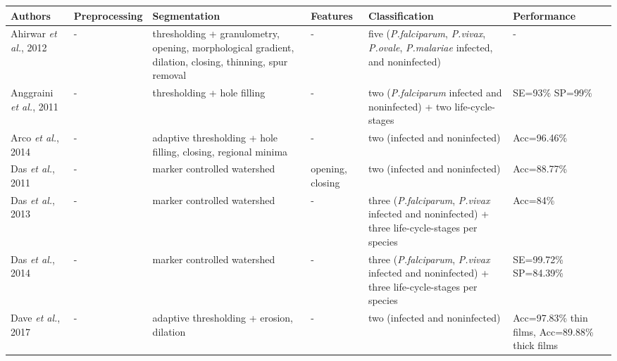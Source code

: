 \footnotesize
\begin{longtable}{C{1.4cm} C{1.5cm} C{2.1cm} C{1.5cm} C{2.7cm} C{2.2cm} }
	\hline
   	\textbf{Authors} & \textbf{Preprocessing} & \textbf{Segmentation} & \textbf{Features} & \textbf{Classification} & \textbf{Performance}  \\[1pt] \hline

Ahirwar \emph{et al.}, 2012  &
   	- &
   	thresholding + granulometry, opening, morphological gradient, dilation, closing, thinning, spur removal &
   	- &
   	five (\emph{P.falciparum}, \emph{P.vivax}, \emph{P.ovale}, \emph{P.malariae} infected, and noninfected) &
   	- \vspace{0.6cm} \\

Anggraini \emph{et al.}, 2011 &
	- &
	thresholding + hole filling &	
	- &
	two (\emph{P.falciparum} infected and noninfected) + two life-cycle-stages &
	SE=93\% SP=99\%
    \vspace{0.6cm}
	\\
Arco \emph{et al.}, 2014 &
	- &
	adaptive thresholding + hole filling, closing, regional minima &	
	- &
	two (infected and noninfected) &
	Acc=96.46\%
	\vspace{0.6cm}
    \\
Das \emph{et al.}, 2011 &
	- &
	marker controlled watershed &	
	opening, closing  &
	two (infected and noninfected) &
	Acc=88.77\%
	\vspace{0.6cm}
    \\

Das \emph{et al.}, 2013 &
	- &
	marker controlled watershed &	
	- &
three (\emph{P.falciparum}, \emph{P.vivax} infected and noninfected) + three life-cycle-stages per species &
	Acc=84\%
	\vspace{0.6cm}
    \\

Das \emph{et al.}, 2014 &
	- &
	marker controlled watershed &	
	- &
three (\emph{P.falciparum}, \emph{P.vivax} infected and noninfected) + three life-cycle-stages per species &
	SE=99.72\% SP=84.39\%
	\vspace{0.6cm}
    \\

Dave \emph{et al.}, 2017 &
	- &
	adaptive thresholding + erosion, dilation &	
	- &
	two (infected and noninfected) &
	Acc=97.83\% thin films, Acc=89.88\% thick films
	\vspace{0.6cm}
    \\


\end{longtable}

